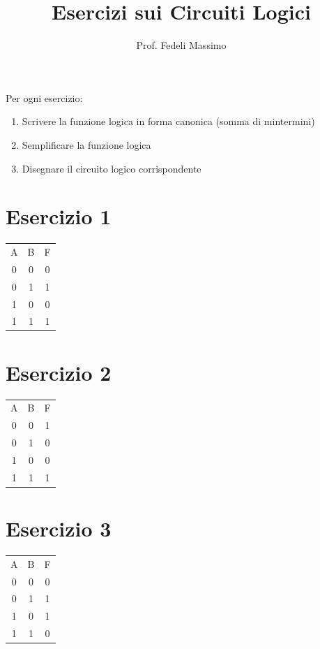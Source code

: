\documentclass[a4paper,12pt]{article}
\title{Esercizi sui Circuiti Logici}
\author{Prof. Fedeli Massimo}
\date{}
\begin{document}
	
	\maketitle
	
	Per ogni esercizio:
	
	\begin{enumerate}
		\item Scrivere la funzione logica in forma canonica (somma di mintermini)
		\item Semplificare la funzione logica
		\item Disegnare il circuito logico corrispondente
	\end{enumerate}
	
	\section*{Esercizio 1}
	
	\begin{tabular}{c c | c}
		A & B & F \\
		0 & 0 & 0 \\
		0 & 1 & 1 \\
		1 & 0 & 0 \\
		1 & 1 & 1 \\
	\end{tabular}
	
	\section*{Esercizio 2}
	
	\begin{tabular}{c c | c}
		A & B & F \\
		0 & 0 & 1 \\
		0 & 1 & 0 \\
		1 & 0 & 0 \\
		1 & 1 & 1 \\
	\end{tabular}
	
	\section*{Esercizio 3}
	
	\begin{tabular}{c c | c}
		A & B & F \\
		0 & 0 & 0 \\
		0 & 1 & 1 \\
		1 & 0 & 1 \\
		1 & 1 & 0 \\
	\end{tabular}
	
\end{document}
